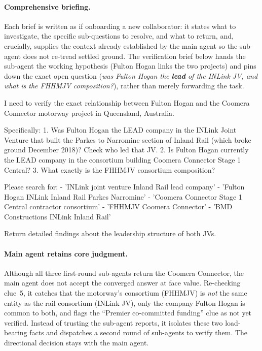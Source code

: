 \documentclass[table]{gtech}
\begin{document}
\paragraph{Comprehensive briefing.} Each brief is written as if onboarding a new collaborator: it states what to investigate, the specific sub-questions to resolve, and what to return, and, crucially, supplies the context already established by the main agent so the sub-agent does not re-tread settled ground. The verification brief below hands the sub-agent the working hypothesis (Fulton Hogan links the two projects) and pins down the exact open question (\emph{was Fulton Hogan the \textbf{lead} of the INLink JV, and what is the FHHMJV composition?}), rather than merely forwarding the task.

\begin{tcolorbox}[breakable,enhanced jigsaw,colback=purple!6,colframe=purple!55,boxrule=0.4pt,left=5pt,right=5pt,top=3pt,bottom=3pt,fonttitle=\bfseries\sffamily\small,coltitle=black,fontupper=\small,title={Brief dispatched to a sub-agent}]
I need to verify the exact relationship between Fulton Hogan and the Coomera Connector motorway project in Queensland, Australia.

Specifically:
1. Was Fulton Hogan the LEAD company in the INLink Joint Venture that built the Parkes to Narromine section of Inland Rail (which broke ground December 2018)? Check who led that JV.
2. Is Fulton Hogan currently the LEAD company in the consortium building Coomera Connector Stage 1 Central?
3. What exactly is the FHHMJV consortium composition?

Please search for:
- 'INLink joint venture Inland Rail lead company'
- 'Fulton Hogan INLink Inland Rail Parkes Narromine'
- 'Coomera Connector Stage 1 Central contractor consortium'
- 'FHHMJV Coomera Connector'
- 'BMD Constructions INLink Inland Rail'

Return detailed findings about the leadership structure of both JVs.
\end{tcolorbox}

\paragraph{Main agent retains core judgment.} Although all three first-round sub-agents return the Coomera Connector, the main agent does not accept the converged answer at face value. Re-checking clue~5, it catches that the motorway's consortium (FHHMJV) is \emph{not} the same entity as the rail consortium (INLink JV), only the company Fulton Hogan is common to both, and flags the ``Premier co-committed funding'' clue as not yet verified. Instead of trusting the sub-agent reports, it isolates these two load-bearing facts and dispatches a second round of sub-agents to verify them. The directional decision stays with the main agent.
\end{document}
